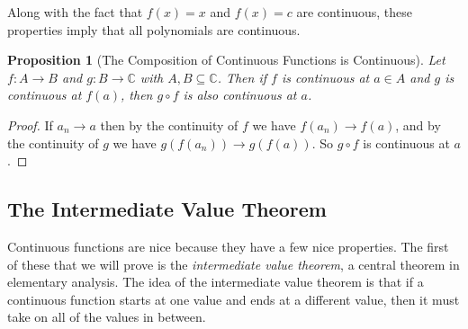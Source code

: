 \documentclass[11pt, a4paper]{article}
\newtheorem{proposition}[theorem]{Proposition}
\theoremstyle{definition}
\newcommand{\C}{\mathbb{C}}
\begin{document}
Along with the fact that $f(x) = x$ and $f(x) = c$ are continuous, these properties imply that all polynomials are continuous.


\begin{proposition}[The Composition of Continuous Functions is Continuous]
	Let $f: A \rightarrow B$ and $g: B \rightarrow \C$ with $A, B \subseteq \C$. Then if $f$ is continuous at $a \in A$ and $g$ is continuous at $f(a)$, then $g \circ f$ is also continuous at $a$.
\end{proposition}
\begin{proof}
	If $a_n \rightarrow a$ then by the continuity of $f$ we have $f(a_n) \rightarrow f(a)$, and by the continuity of $g$ we have $g(f(a_n)) \rightarrow g(f(a))$. So $g\circ f$ is continuous at $a$.
\end{proof}

\subsection{The Intermediate Value Theorem}

Continuous functions are nice because they have a few nice properties. The first of these that we will prove is the \emph{intermediate value theorem}, a central theorem in elementary analysis. The idea of the intermediate value theorem is that if a continuous function starts at one value and ends at a different value, then it must take on all of the values in between.
\end{document}
